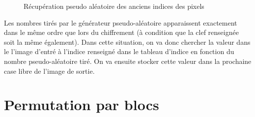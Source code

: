 \documentclass[a4paper]{article}
\begin{document}
        \begin{figure}[htbp]
            \begin{center}
                \caption{Récupération pseudo aléatoire des anciens indices des pixels}
                \label{fig:decipher}
            \end{center}
        \end{figure}

        Les nombres tirés par le générateur pseudo-aléatoire apparaissent exactement dans le même ordre que lors du chiffrement (à condition que la clef renseignée soit la même également).
        Dans cette situation, on va donc chercher la valeur dans le l'image d'entré à l'indice renseigné dans le tableau d'indice en fonction du nombre pseudo-aléatoire tiré. On va ensuite stocker cette valeur dans la prochaine case libre de l'image de sortie.

    \section{Permutation par blocs}
\end{document}
